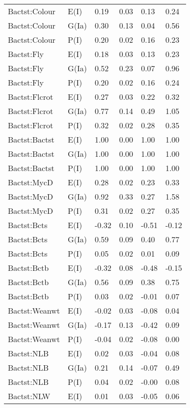 \begin{center}
\begin{longtable}{|p{1.1in}|p{0.7in}|p{0.7in}|p{0.6in}|p{0.6in}|p{0.6in}|}
  Bactst:Colour & E(I) & 0.19 & 0.03 & 0.13 & 0.24 \\ 
  Bactst:Colour & G(Ia) & 0.30 & 0.13 & 0.04 & 0.56 \\ 
  Bactst:Colour & P(I) & 0.20 & 0.02 & 0.16 & 0.23 \\ 
  Bactst:Fly & E(I) & 0.18 & 0.03 & 0.13 & 0.23 \\ 
  Bactst:Fly & G(Ia) & 0.52 & 0.23 & 0.07 & 0.96 \\ 
  Bactst:Fly & P(I) & 0.20 & 0.02 & 0.16 & 0.24 \\ 
  Bactst:Flcrot & E(I) & 0.27 & 0.03 & 0.22 & 0.32 \\ 
  Bactst:Flcrot & G(Ia) & 0.77 & 0.14 & 0.49 & 1.05 \\ 
  Bactst:Flcrot & P(I) & 0.32 & 0.02 & 0.28 & 0.35 \\ 
  Bactst:Bactst & E(I) & 1.00 & 0.00 & 1.00 & 1.00 \\ 
  Bactst:Bactst & G(Ia) & 1.00 & 0.00 & 1.00 & 1.00 \\ 
  Bactst:Bactst & P(I) & 1.00 & 0.00 & 1.00 & 1.00 \\ 
  Bactst:MycD & E(I) & 0.28 & 0.02 & 0.23 & 0.33 \\ 
  Bactst:MycD & G(Ia) & 0.92 & 0.33 & 0.27 & 1.58 \\ 
  Bactst:MycD & P(I) & 0.31 & 0.02 & 0.27 & 0.35 \\ 
  Bactst:Bcts & E(I) & -0.32 & 0.10 & -0.51 & -0.12 \\ 
  Bactst:Bcts & G(Ia) & 0.59 & 0.09 & 0.40 & 0.77 \\ 
  Bactst:Bcts & P(I) & 0.05 & 0.02 & 0.01 & 0.09 \\ 
  Bactst:Bctb & E(I) & -0.32 & 0.08 & -0.48 & -0.15 \\ 
  Bactst:Bctb & G(Ia) & 0.56 & 0.09 & 0.38 & 0.75 \\ 
  Bactst:Bctb & P(I) & 0.03 & 0.02 & -0.01 & 0.07 \\ 
  Bactst:Weanwt & E(I) & -0.02 & 0.03 & -0.08 & 0.04 \\ 
  Bactst:Weanwt & G(Ia) & -0.17 & 0.13 & -0.42 & 0.09 \\ 
  Bactst:Weanwt & P(I) & -0.04 & 0.02 & -0.08 & 0.00 \\ 
  Bactst:NLB & E(I) & 0.02 & 0.03 & -0.04 & 0.08 \\ 
  Bactst:NLB & G(Ia) & 0.21 & 0.14 & -0.07 & 0.49 \\ 
  Bactst:NLB & P(I) & 0.04 & 0.02 & -0.00 & 0.08 \\ 
  Bactst:NLW & E(I) & 0.01 & 0.03 & -0.05 & 0.06 \\ 

\end{longtable}
\end{center}
